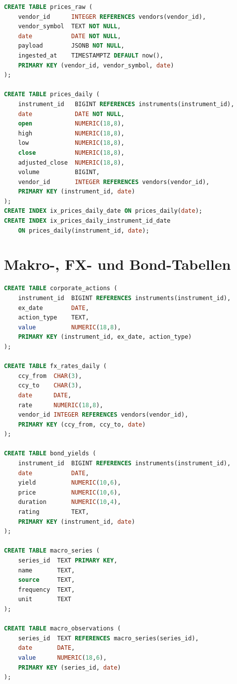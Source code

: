 \begin{lstlisting}[language=sql, caption={Preis-Tabellen},label=lst:ddl-preise]
CREATE TABLE prices_raw (
    vendor_id      INTEGER REFERENCES vendors(vendor_id),
    vendor_symbol  TEXT NOT NULL,
    date           DATE NOT NULL,
    payload        JSONB NOT NULL,
    ingested_at    TIMESTAMPTZ DEFAULT now(),
    PRIMARY KEY (vendor_id, vendor_symbol, date)
);

CREATE TABLE prices_daily (
    instrument_id   BIGINT REFERENCES instruments(instrument_id),
    date            DATE NOT NULL,
    open            NUMERIC(18,8),
    high            NUMERIC(18,8),
    low             NUMERIC(18,8),
    close           NUMERIC(18,8),
    adjusted_close  NUMERIC(18,8),
    volume          BIGINT,
    vendor_id       INTEGER REFERENCES vendors(vendor_id),
    PRIMARY KEY (instrument_id, date)
);
CREATE INDEX ix_prices_daily_date ON prices_daily(date);
CREATE INDEX ix_prices_daily_instrument_id_date
    ON prices_daily(instrument_id, date);
\end{lstlisting}

\section{Makro-, FX- und Bond-Tabellen}

\begin{lstlisting}[language=sql, caption={Makro-, FX- und Bond-Tabellen},label=lst:ddl-makro]
CREATE TABLE corporate_actions (
    instrument_id  BIGINT REFERENCES instruments(instrument_id),
    ex_date        DATE,
    action_type    TEXT,
    value          NUMERIC(18,8),
    PRIMARY KEY (instrument_id, ex_date, action_type)
);

CREATE TABLE fx_rates_daily (
    ccy_from  CHAR(3),
    ccy_to    CHAR(3),
    date      DATE,
    rate      NUMERIC(18,8),
    vendor_id INTEGER REFERENCES vendors(vendor_id),
    PRIMARY KEY (ccy_from, ccy_to, date)
);

CREATE TABLE bond_yields (
    instrument_id  BIGINT REFERENCES instruments(instrument_id),
    date           DATE,
    yield          NUMERIC(10,6),
    price          NUMERIC(10,6),
    duration       NUMERIC(10,4),
    rating         TEXT,
    PRIMARY KEY (instrument_id, date)
);

CREATE TABLE macro_series (
    series_id  TEXT PRIMARY KEY,
    name       TEXT,
    source     TEXT,
    frequency  TEXT,
    unit       TEXT
);

CREATE TABLE macro_observations (
    series_id  TEXT REFERENCES macro_series(series_id),
    date       DATE,
    value      NUMERIC(18,6),
    PRIMARY KEY (series_id, date)
);
\end{lstlisting}

